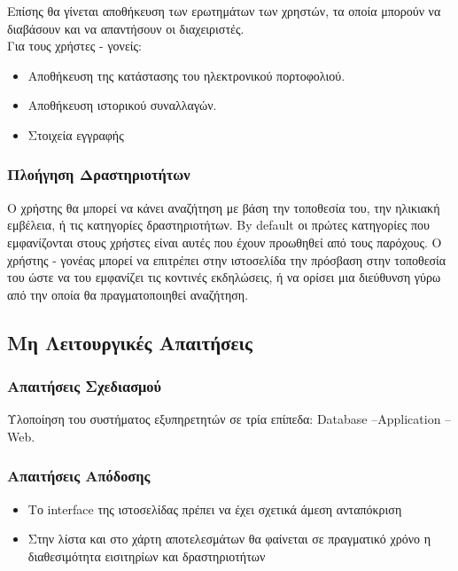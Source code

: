 \documentclass[letterpaper,6pt]{article}
\begin{document}
Επίσης θα γίνεται αποθήκευση των ερωτημάτων των χρηστών, τα οποία μπορούν να διαβάσουν και να απαντήσουν οι διαχειριστές.
~\\
Για τους χρήστες - γονείς:
\begin{itemize}
  \item Αποθήκευση της κατάστασης του ηλεκτρονικού πορτοφολιού.
		\item Αποθήκευση ιστορικού συναλλαγών.
		\item Στοιχεία εγγραφής
\end{itemize}

\subsubsection{Πλοήγηση Δραστηριοτήτων}

Ο χρήστης θα μπορεί να κάνει αναζήτηση με βάση την τοποθεσία του, την ηλικιακή εμβέλεια, ή τις κατηγορίες δραστηριοτήτων.
By default οι πρώτες κατηγορίες που εμφανίζονται στους χρήστες είναι αυτές που έχουν προωθηθεί από τους παρόχους.
Ο χρήστης - γονέας μπορεί να επιτρέπει στην ιστοσελίδα την πρόσβαση στην τοποθεσία του ώστε να του εμφανίζει τις κοντινές εκδηλώσεις, ή να ορίσει μια διεύθυνση γύρω από την οποία θα πραγματοποιηθεί αναζήτηση.

\subsection{Μη Λειτουργικές Απαιτήσεις}

\subsubsection{Απαιτήσεις Σχεδιασμού}

	Υλοποίηση του συστήματος εξυπηρετητών σε τρία επίπεδα: Database –Application – Web. 
	
\subsubsection{Απαιτήσεις Απόδοσης}
	
\begin{itemize}
  \item Το interface της ιστοσελίδας πρέπει να έχει σχετικά άμεση ανταπόκριση 
  \item Στην λίστα και στο χάρτη αποτελεσμάτων θα φαίνεται σε πραγματικό χρόνο η διαθεσιμότητα εισιτηρίων και δραστηριοτήτων
\end{itemize}
\end{document}

